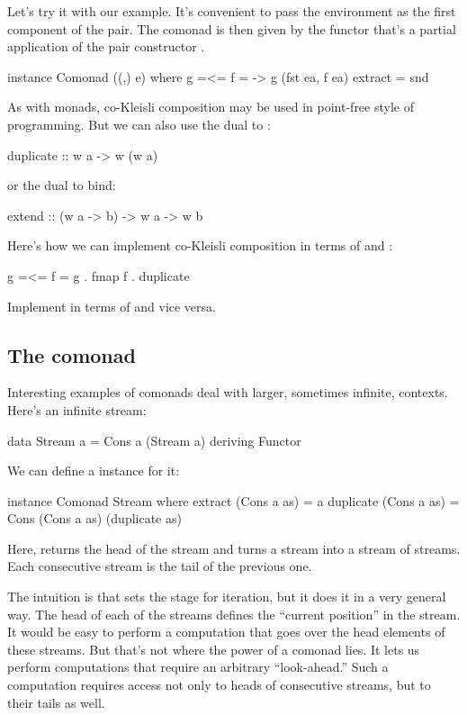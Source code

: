 \documentclass[DaoFP]{subfiles}
\begin{document}
Let's try it with our example. It's convenient to pass the environment as the first component of the pair. The comonad is then given by the functor that's a partial application of the pair constructor .
\begin{haskell}
instance Comonad ((,) e) where
  g =<= f = \ea -> g (fst ea, f ea)
  extract = snd
\end{haskell}

As with monads, co-Kleisli composition may be used in point-free style of programming. But we can also use the dual to :
\begin{haskell}
  duplicate :: w a -> w (w a)
\end{haskell}
or the dual to bind:
\begin{haskell}
  extend :: (w a -> b) -> w a -> w b
\end{haskell}
Here's how we can implement co-Kleisli composition in terms of  and :
\begin{haskell}
   g =<= f = g . fmap f . duplicate
\end{haskell}
\begin{exercise}
Implement  in terms of  and vice versa.
\end{exercise}
\subsection{The  comonad}
Interesting examples of comonads deal with larger, sometimes infinite, contexts. Here's an infinite stream:
\begin{haskell}
data Stream a = Cons a (Stream a)
    deriving Functor
\end{haskell}
We can define a  instance for it:
\begin{haskell}
instance Comonad Stream where
  extract (Cons a as) = a
  duplicate (Cons a as) = Cons (Cons a as) (duplicate as)
\end{haskell}
Here,  returns the head of the stream and  turns a stream into a stream of streams. Each consecutive stream is the tail of the previous one. 

The intuition is that  sets the stage for iteration, but it does it in a very general way. The head of each of the streams defines the ``current position'' in the stream. It would be easy to perform a computation that goes over the head elements of these streams. But that's not where the power of a comonad lies. It lets us perform computations that require an arbitrary ``look-ahead.''  Such a computation requires access not only to heads of consecutive streams, but to their tails as well.
\end{document}
